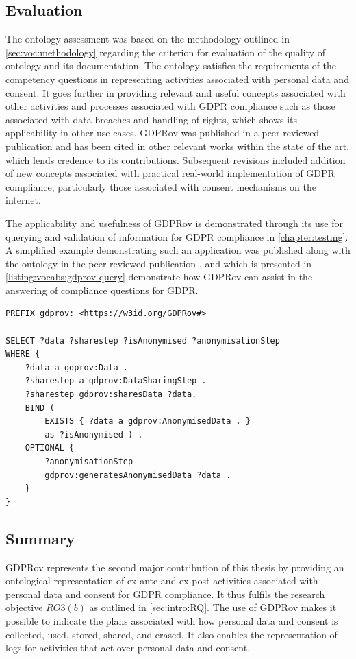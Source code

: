 \subsection{Evaluation}
The ontology assessment was based on the methodology outlined in \autoref{sec:voc:methodology} regarding the criterion for evaluation of the quality of ontology and its documentation.
The ontology satisfies the requirements of the competency questions in representing activities associated with personal data and consent.
It goes further in providing relevant and useful concepts associated with other activities and processes associated with GDPR compliance such as those associated with data breaches and handling of rights, which shows its applicability in other use-cases.
GDPRov was published \cite{} in a peer-reviewed publication and has been cited in other relevant works within the state of the art, which lends credence to its contributions.
Subsequent revisions included addition of new concepts associated with practical real-world implementation of GDPR compliance, particularly those associated with consent mechanisms on the internet.

The applicability and usefulness of GDPRov is demonstrated through its use for querying and validation of information for GDPR compliance in \autoref{chapter:testing}.
A simplified example demonstrating such an application was published along with the ontology in the peer-reviewed publication \cite{}, and which is presented in \autoref{listing:vocabs:gdprov-query} demonstrate how GDPRov can assist in the answering of compliance questions for GDPR.

\begin{lstlisting}[label={listing:vocabs:gdprov-query},caption={SPARQL query demonstrating use of GDPRov in representing and retrieving steps, data, anonymity level, and anonymisation process based on sharing of data \cite{}}]
PREFIX gdprov: <https://w3id.org/GDPRov#>

SELECT ?data ?sharestep ?isAnonymised ?anonymisationStep
WHERE {
    ?data a gdprov:Data .
    ?sharestep a gdprov:DataSharingStep .
    ?sharestep gdprov:sharesData ?data. 
    BIND (
        EXISTS { ?data a gdprov:AnonymisedData . }
        as ?isAnonymised ) .
    OPTIONAL {
        ?anonymisationStep
        gdprov:generatesAnonymisedData ?data .
    }
}
\end{lstlisting}

\subsection*{Summary}
GDPRov represents the second major contribution of this thesis by providing an ontological representation of ex-ante and ex-post activities associated with personal data and consent for GDPR compliance.
It thus fulfils the research objective $RO3(b)$ as outlined in \autoref{sec:intro:RQ}. 
The use of GDPRov makes it possible to indicate the plans associated with how personal data and consent is collected, used, stored, shared, and erased.
It also enables the representation of logs for activities that act over personal data and consent.


